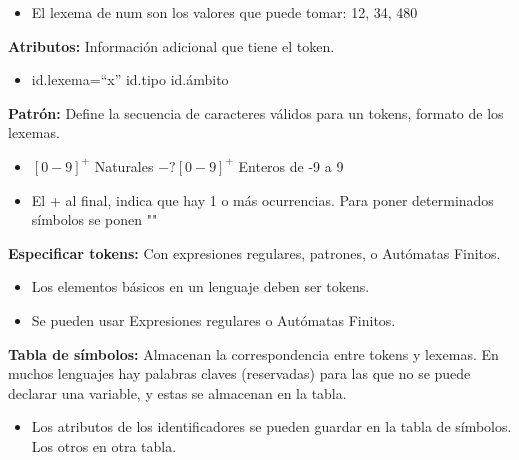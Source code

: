 \documentclass[12pt, twoside, openright]{report} %
\begin{document}
\begin{itemize}

\item
  El lexema de num son los valores que puede tomar: 12, 34, 480
\end{itemize}

\textbf{Atributos:} Información adicional que tiene el token.

\begin{itemize}

\item
  id.lexema=``x'' id.tipo id.ámbito
\end{itemize}

\textbf{Patrón:} Define la secuencia de caracteres válidos para un
tokens, formato de los lexemas.

\begin{itemize}
\item
  \([0-9]^+\) Naturales \(-?[0-9]^+\) Enteros de -9 a 9
\item
  El + al final, indica que hay 1 o más ocurrencias. Para poner
  determinados símbolos se ponen ""
\end{itemize}

\textbf{Especificar tokens:} Con expresiones regulares, patrones, o
Autómatas Finitos.

\begin{itemize}
\item
  Los elementos básicos en un lenguaje deben ser tokens.
\item
  Se pueden usar Expresiones regulares o Autómatas Finitos.
\end{itemize}

\textbf{Tabla de símbolos:} Almacenan la correspondencia entre tokens y lexemas. 
En muchos lenguajes hay palabras claves (reservadas) para las que no se puede declarar una variable, y estas se almacenan en la tabla.

\begin{itemize}

\item
  Los atributos de los identificadores se pueden guardar en la tabla de
  símbolos. Los otros en otra tabla.
\end{itemize}
\end{document}
